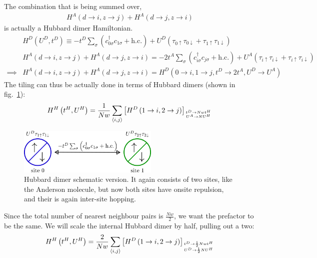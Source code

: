 \documentclass[12pt]{article}
\numberwithin{equation}{section}
\begin{document}
The combination that is being summed over,
\begin{equation}\begin{aligned}
	H^A\left(d \to i, z \to j\right) + H^A\left(d \to j, z \to i\right)
\end{aligned}\end{equation}
is actually a Hubbard dimer Hamiltonian.
\begin{equation}\begin{aligned}
	&H^D(U^D, t^D) \equiv -t^D\sum_\sigma\left( c^\dagger_{0\sigma}c_{1\sigma} + \text{h.c.} \right) + U^D\left( \tau_{0 \uparrow}\tau_{0 \downarrow} + \tau_{1 \uparrow}\tau_{1 \downarrow}\right)\\
	&H^A\left(d \to i, z \to j\right) + H^A\left(d \to j, z \to i\right) = -2t^A\sum_\sigma\left( c^\dagger_{i\sigma}c_{j\sigma} + \text{h.c.} \right) + U^A\left( \tau_{i \uparrow}\tau_{i \downarrow} + \tau_{i \uparrow}\tau_{i \downarrow}\right)\\
	\implies &H^A\left(d \to i, z \to j\right) + H^A\left(d \to j, z \to i\right) = H^D(0 \to i, 1 \to j, t^D \to 2t^A, U^D \to U^A)
\end{aligned}\end{equation}
The tiling can thus be actually done in terms of Hubbard dimers (shown in fig.~\ref{hubb-dim}):
\begin{equation}\begin{aligned}
	H^H\left(t^H, U^H\right)  = \frac{1}{Nw}\sum_{\left<i,j\right>}\left[H^D\left(1 \to i, 2 \to j\right)\right]_{t^D \to Nwt^H \atop{U^A \to N U^H}}
\end{aligned}\end{equation}
\begin{figure}[htpb!]
	\centering
	\includegraphics[width=0.6\textwidth]{./hubb_dim.png}
	\caption{Hubbard dimer schematic version. It again consists of two sites, like the Anderson molecule, but now both sites have onsite repulsion, and their is again inter-site hopping.}
	\label{hubb-dim}
\end{figure}
Since the total number of nearest neighbour pairs is $\frac{Nw}{2}$, we want the prefactor to be the same. We will scale the internal Hubbard dimer by half, pulling out a two:
\begin{equation}\begin{aligned}
	\label{H_tiled}
	H^H\left(t^H, U^H\right)  = \frac{2}{Nw}\sum_{\left<i,j\right>}\left[H^D\left(1 \to i, 2 \to j\right)\right]_{t^D \to \frac{1}{2}Nwt^H \atop{U^D \to \frac{1}{2}N U^H}}
\end{aligned}\end{equation}
\end{document}
